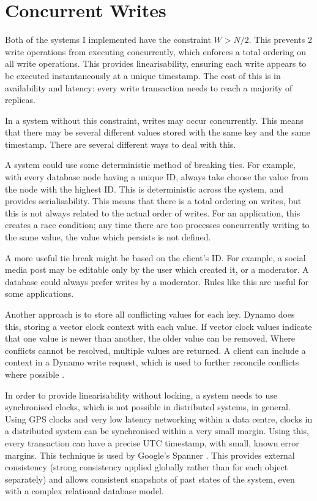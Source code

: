 \documentclass[12pt,a4paper,twoside,openany]{report}
\begin{document}
\section{Concurrent Writes}

Both of the systems I implemented have the constraint $W > N/2$. This prevents 2 write operations from executing concurrently, which enforces a total ordering on all write operations. This provides linearisability, ensuring each write appears to be executed instantaneously at a unique timestamp. The cost of this is in availability and latency: every write transaction needs to reach a majority of replicas.

In a system without this constraint, writes may occur concurrently. This means that there may be several different values stored with the same key and the same timestamp. There are several different ways to deal with this.

A system could use some deterministic method of breaking ties. For example, with every database node having a unique ID, always take choose the value from the node with the highest ID. This is deterministic across the system, and provides serialisability. This means that there is a total ordering on writes, but this is not always related to the actual order of writes. For an application, this creates a race condition; any time there are too processes concurrently writing to the same value, the value which persists is not defined.

A more useful tie break might be based on the client's ID. For example, a social media post may be editable only by the user which created it, or a moderator. A database could always prefer writes by a moderator. Rules like this are useful for some applications.

Another approach is to store all conflicting values for each key. Dynamo does this, storing a vector clock context with each value. If vector clock values indicate that one value is newer than another, the older value can be removed. Where conflicts cannot be resolved, multiple values are returned. A client can include a context in a Dynamo write request, which is used to further reconcile conflicts where possible \cite{decandia2007dynamo}.

In order to provide linearisability without locking, a system needs to use synchronised clocks, which is not possible in distributed systems, in general. Using GPS clocks and very low latency networking within a data centre, clocks in a distributed system can be synchronised within a very small margin. Using this, every transaction can have a precise UTC timestamp, with small, known error margins. This technique is used by Google's Spanner \cite{45855}. This provides external consistency (strong consistency applied globally rather than for each object separately) and allows consistent snapshots of past states of the system, even with a complex relational database model.
\end{document}
